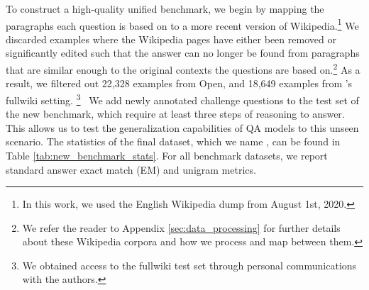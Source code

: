 To construct a high-quality unified benchmark, we begin by mapping the paragraphs each question is based on to a more recent version of Wikipedia.\footnote{In this work, we used the English Wikipedia dump from August 1st, 2020.}
We discarded examples where the Wikipedia pages have either been removed or significantly edited such that the answer can no longer be found from paragraphs that are similar enough to the original contexts the questions are based on.\footnote{We refer the reader to Appendix \ref{sec:data_processing} for further details about these Wikipedia corpora and how we process and map between them.}
As a result, we filtered out 22,328 examples from \squad{} Open, and 18,649 examples from \hotpotqa{}'s fullwiki setting.%
\ifaclfinal\else\footnote{We obtained access to the \hotpotqa{} fullwiki test set through personal communications with the authors.}\fi~ We add newly annotated challenge questions to the test set of the new benchmark, which require at least three steps of reasoning to answer.
This allows us to test the generalization capabilities of QA models to this unseen scenario.
The statistics of the final dataset, which we name \beerqa{}, can be found in Table \ref{tab:new_benchmark_stats}.
For all benchmark datasets, we report standard answer exact match (EM) and unigram \fone{} metrics.

\begin{table}
    \centering
    \caption{Counts of QA examples in the new unified benchmark, \beerqa.} 
    \label{tab:new_benchmark_stats}
\end{table}

